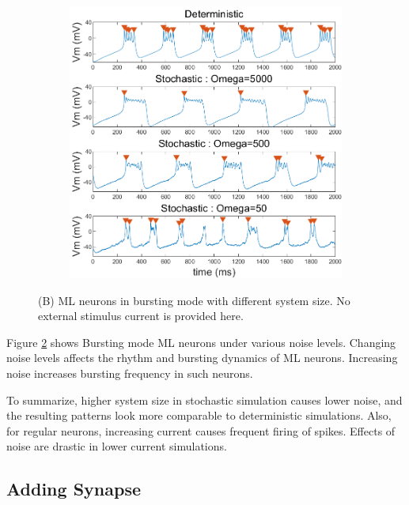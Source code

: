 \documentclass[
]{article}
\begin{document}
\begin{figure}    \ContinuedFloat
  \captionsetup[subfigure]{labelformat=empty} \centering
  \begin{subfigure}[b]{0.6\textwidth}
    \includegraphics[width=\textwidth]{figs/F1_B_ML_Omega_Bursting.png}
    \caption{} \label{fig:fig1b}
  \end{subfigure}
  \vspace{-0.75cm}
  \caption{(B) ML neurons in bursting mode with different system size. No external stimulus current is provided here.}
\end{figure}

Figure \ref{fig:fig1b} shows Bursting mode ML neurons under various noise levels. Changing noise levels affects the rhythm and bursting dynamics of ML neurons. Increasing noise increases bursting frequency in such neurons.

To summarize, higher system size in stochastic simulation causes lower noise, and the resulting patterns look more comparable to deterministic simulations. Also, for regular neurons, increasing current causes frequent firing of spikes. Effects of noise are drastic in lower current simulations.

\hypertarget{syn}{%
\subsection{Adding Synapse}\label{syn}}
\end{document}
